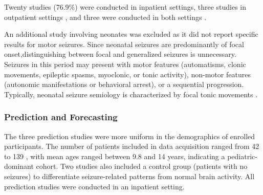 Twenty studies (76.9\%) were conducted in inpatient settings, three studies in outpatient settings \cite{Chowdhury2022-bi,Wang2022-lt,Dong2022-oo}, and three were conducted in both settings \cite{Wang2025-my,Regalia2019-ch,Nasseri2021-xn}. 

An additional study \cite{Chen2023-ns} involving neonates was excluded as it did not report specific results for motor seizures. Since neonatal seizures are predominantly of focal onset,distinguishing between focal and generalized seizures is unnecessary. Seizures in this period may present with motor features (automatisms, clonic movements, epileptic spasms, myoclonic, or tonic activity), non-motor features (autonomic manifestations or behavioral arrest), or a sequential progression. Typically, neonatal seizure semiology is characterized by focal tonic movements \cite{Ziobro24-neo}.

\subsubsection{Prediction and Forecasting}
The three prediction studies were more uniform in the demographics of enrolled participants. The number of patients included in data acquisition ranged from 42 \cite{Vieluf2023-ta} to 139 \cite{Vieluf2023-zv}, with mean ages ranged between 9.8 \cite{Meisel2020-ii} and 14 \cite{Vieluf2023-ta} years, indicating a pediatric-dominant cohort. Two studies \cite{Vieluf2023-zv,Vieluf2023-ta} also included a control group (patients with no seizures) to differentiate seizure-related patterns from normal brain activity. All prediction studies were conducted in an inpatient setting.
